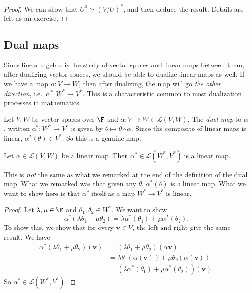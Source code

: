 \documentclass[a4paper]{article}
\begin{document}
\begin{proof}
  We can show that $U^0 \simeq (V/U)^*$, and then deduce the result. Details are left as an exercise.
\end{proof}

\subsection{Dual maps}
Since linear algebra is the study of vector spaces and linear maps between them, after dualizing vector spaces, we should be able to dualize linear maps as well. If we have a map $\alpha: V \to W$, then after dualizing, the map will go \emph{the other direction}, i.e.\ $\alpha^*: W^* \to V^*$. This is a characteristic common to most dualization processes in mathematics.

\begin{defi}
  Let $V, W$ be vector spaces over $\F$ and $\alpha: V\to W \in \mathcal{L}(V, W)$. The \emph{dual map} to $\alpha$, written $\alpha^*: W^* \to V^*$ is given by $\theta \mapsto \theta \circ \alpha$. Since the composite of linear maps is linear, $\alpha^*(\theta) \in V^*$. So this is a genuine map.
\end{defi}

\begin{prop}
  Let $\alpha \in \mathcal{L}(V, W)$ be a linear map. Then $\alpha^* \in \mathcal{L}(W^*, V^*)$ is a linear map.
\end{prop}
This is \emph{not} the same as what we remarked at the end of the definition of the dual map. What we remarked was that given any $\theta$, $\alpha^*(\theta)$ is a linear map. What we want to show here is that $\alpha^*$ itself as a map $W^* \to V^*$ is linear.

\begin{proof}
  Let $\lambda, \mu \in \F$ and $\theta_1, \theta_2 \in W^*$. We want to show
  \[
    \alpha^*(\lambda \theta_1 + \mu \theta_2) = \lambda \alpha^*(\theta_1) + \mu \alpha^*(\theta_2).
  \]
  To show this, we show that for every $\mathbf{v} \in V$, the left and right give the same result. We have
  \begin{align*}
    \alpha^*(\lambda \theta_1 + \mu \theta_2)(\mathbf{v}) &= (\lambda \theta_1 + \mu \theta_2)(\alpha \mathbf{v}) \\
    &= \lambda \theta_1 (\alpha (\mathbf{v})) + \mu \theta_2 (\alpha(\mathbf{v})) \\
    &= (\lambda \alpha^*(\theta_1)+ \mu \alpha^*(\theta_2))(\mathbf{v}).
  \end{align*}
  So $\alpha^* \in \mathcal{L}(W^*, V^*)$.
\end{proof}
\end{document}
